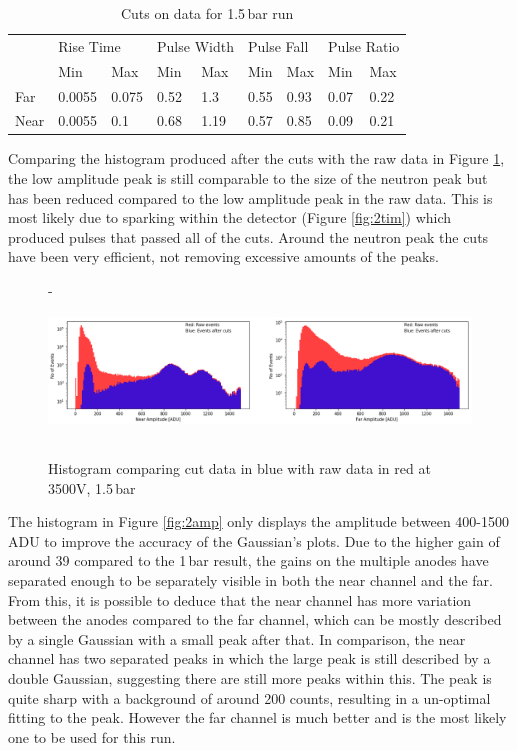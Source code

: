 \documentclass[a4paper]{article}
\begin{document}
\begin{table}
\centering
\caption{Cuts on data for 1.5\,bar run}
\label{tb:15bar}
\begin{tabular}{|l|ll|ll|ll|ll|} 
\cline{2-9}
\multicolumn{1}{l|}{} & \multicolumn{2}{l|}{Rise Time}   & \multicolumn{2}{l|}{Pulse Width} & \multicolumn{2}{l|}{Pulse Fall} & \multicolumn{2}{l|}{Pulse Ratio}  \\ 
\cline{2-9}
\multicolumn{1}{l|}{} & \multicolumn{1}{l|}{Min} & Max   & \multicolumn{1}{l|}{Min} & Max   & \multicolumn{1}{l|}{Min} & Max  & \multicolumn{1}{l|}{Min} & Max    \\ 
\hline
Far                   & 0.0055                   & 0.075 & 0.52                     & 1.3   & 0.55                     & 0.93 & 0.07                     & 0.22   \\ 
\hline
Near                  & 0.0055                   & 0.1   & 0.68                     & 1.19  & 0.57                     & 0.85 & 0.09                     & 0.21   \\
\hline
\end{tabular}
\end{table}
\noindent Comparing the histogram produced after the cuts with the raw data in Figure \ref{fig:2com}, the low amplitude peak is still comparable to the size of the neutron peak but has been reduced compared to the low amplitude peak in the raw data. This is most likely due to sparking within the detector (Figure \ref{fig:2tim}) which produced pulses that passed all of the cuts. Around the neutron peak the cuts have been very efficient, not removing excessive amounts of the peaks.
\begin{figure}[H]-
    \centering
    \includegraphics[height=3.7cm]{plots/uk24n002_ampcomp.png}
    \caption{Histogram comparing cut data in blue with raw data in red at 3500V, 1.5\,bar}
    \label{fig:2com}
\end{figure}
\noindent The histogram in Figure \ref{fig:2amp} only displays the amplitude between 400-1500\,ADU to improve the accuracy of the Gaussian's plots. Due to the higher gain of around 39 compared to the 1\,bar result, the gains on the multiple anodes have separated enough to be separately visible in both the near channel and the far. From this, it is possible to deduce that the near channel has more variation between the anodes compared to the far channel, which can be mostly described by a single Gaussian with a small peak after that. In comparison, the near channel has two separated peaks in which the large peak is still described by a double Gaussian, suggesting there are still more peaks within this. The peak is quite sharp with a background of around 200 counts, resulting in a un-optimal fitting to the peak. However the far channel is much better and is the most likely one to be used for this run.
\end{document}
